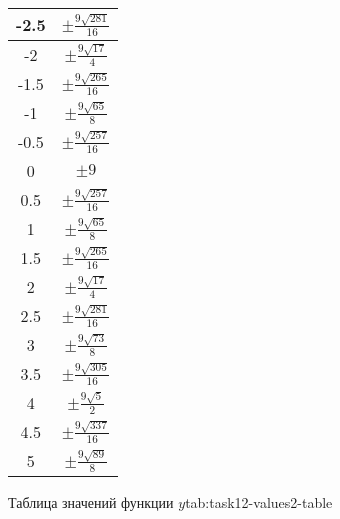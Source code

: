 \documentclass[a4paper, 12pt, oneside]{article}
\begin{document}
\begin{enumerate}
{\begin{tabular}{|c|c|}
                \hline
                -2.5 & $\pm\frac{9\sqrt{281}}{16}$ \\
                \hline
                -2   & $\pm\frac{9\sqrt{17}}{4}$   \\
                \hline
                -1.5 & $\pm\frac{9\sqrt{265}}{16}$ \\
                \hline
                -1   & $\pm\frac{9\sqrt{65}}{8}$   \\
                \hline
                -0.5 & $\pm\frac{9\sqrt{257}}{16}$ \\
                \hline
                0    & $\pm9$                      \\
                \hline
                0.5  & $\pm\frac{9\sqrt{257}}{16}$ \\
                \hline
                1    & $\pm\frac{9\sqrt{65}}{8}$   \\
                \hline
                1.5  & $\pm\frac{9\sqrt{265}}{16}$ \\
                \hline
                2    & $\pm\frac{9\sqrt{17}}{4}$   \\
                \hline
                2.5  & $\pm\frac{9\sqrt{281}}{16}$ \\
                \hline
                3    & $\pm\frac{9\sqrt{73}}{8}$   \\
                \hline
                3.5  & $\pm\frac{9\sqrt{305}}{16}$ \\
                \hline
                4    & $\pm\frac{9\sqrt{5}}{2}$    \\
                \hline
                4.5  & $\pm\frac{9\sqrt{337}}{16}$ \\
                \hline
                5    & $\pm\frac{9\sqrt{89}}{8}$   \\
                \hline
            \end{tabular}
        }{Таблица значений функции $y$}{tab:task12-values2-table}
    \end{enumerate}
\end{document}
